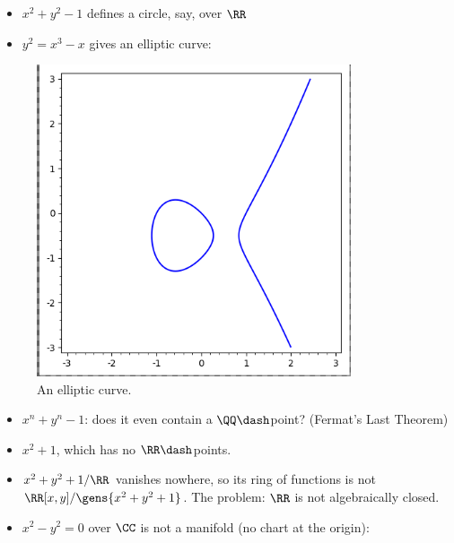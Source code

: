 \begin{example}

\envlist

\begin{itemize}
\item
  \(x^2 + y^2 - 1\) defines a circle, say, over \(\RR\)
\item
  \(y^2 = x^3-x\) gives an elliptic curve:
\end{itemize}

\begin{figure}
\centering
\includegraphics[width=3.64583in,height=\textheight]{figures/image_2020-08-21-01-04-22.png}
\caption{An elliptic curve.}
\end{figure}

\begin{itemize}
\item
  \(x^n+y^n-1\): does it even contain a \(\QQ\dash\)point? (Fermat's
  Last Theorem)
\item
  \(x^2 + 1\), which has no \(\RR\dash\)points.
\item
  \(x^2 + y^2 + 1/\RR\) vanishes nowhere, so its ring of functions is
  not \(\RR[x, y] / \gens{x^2 + y^2 + 1}\). The problem: \(\RR\) is not
  algebraically closed.
\item
  \(x^2 - y^2 = 0\) over \(\CC\) is not a manifold (no chart at the
  origin):
\end{itemize}


\end{example}
